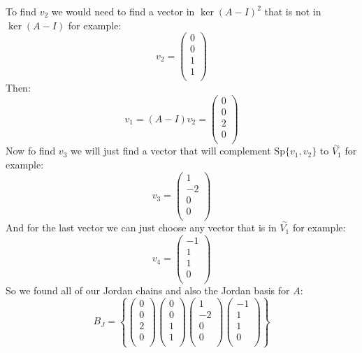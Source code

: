 \documentclass[11pt,a4paper]{article}
\theoremstyle{plain}
\newcommand{\Sp}{\text{Sp}}
\begin{document}
	To find $v_2$ we would need to find a vector in $\ker(A-I)^2$ that
	is not in $\ker(A-I)$ for example:
	\[
		v_2 = \begin{pmatrix} 0\\ 0\\ 1\\ 1\\ \end{pmatrix}
	\]
	Then:
	\[
		v_1 = (A-I)v_2 = \begin{pmatrix} 0\\ 0\\ 2\\ 0\\ \end{pmatrix}
	\]
	Now fo find $v_3$ we will just find a vector that will complement 
	$\Sp\{v_1,v_2\}$ to $\overset{\sim}{V_1}$ for example:
	\[
		v_3 = \begin{pmatrix} 1\\ -2\\ 0\\ 0\\ \end{pmatrix}
	\]
	And for the last vector we can just choose any vector that is in 
	$\overset{\sim}{V_1}$ for example:
	\[
		v_4 = \begin{pmatrix} -1\\ 1\\ 1\\ 0\\ \end{pmatrix}
	\]
	So we found all of our Jordan chains and also the Jordan basis for $A$:
	\[
		B_J = 
		\left\{
		\begin{pmatrix} 0\\ 0\\ 2\\ 0\\ \end{pmatrix}
		\begin{pmatrix} 0\\ 0\\ 1\\ 1\\ \end{pmatrix}
		\begin{pmatrix} 1\\ -2\\ 0\\ 0\\ \end{pmatrix}
		\begin{pmatrix} -1\\ 1\\ 1\\ 0\\ \end{pmatrix}
		\right\}
	\]
\end{document}
